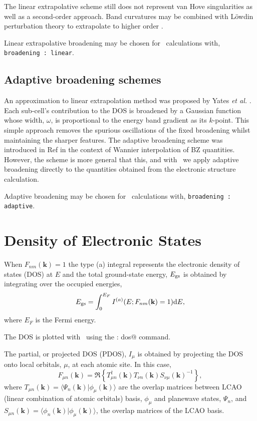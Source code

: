 \documentclass[a4paper,11pt,twoside]{book}
\newcommand{\kbf}{\mathbf{k}}
\renewcommand{\d}{\mathrm{d}}
\begin{document}
The linear extrapolative scheme still does not represent van Hove singularities as well as a second-order approach.  
%
Band curvatures may be combined with L\"owdin perturbation theory to extrapolate to higher order \cite{pickard:PRB:1999,pickard:PRB:2000}.

Linear extrapolative broadening may be chosen  for \optados\ calculations with, \texttt{broadening : linear}.


\subsection{Adaptive broadening schemes}
An approximation to linear extrapolation method was proposed by Yates \emph{et al.} \cite{yates:PRB:2007}.
%
Each sub-cell's contribution to the DOS is broadened by a Gaussian function whose width, $\omega$, is proportional to the energy band gradient as its $k$-point.
%
This simple approach removes the spurious oscillations of the fixed broadening whilst maintaining the sharper features.
%
The adaptive broadening scheme was introduced in Ref \cite{yates:PRB:2007} in the context of Wannier interpolation of BZ quantities. 
%
However, the scheme is more general that this, and with \optados\ we apply adaptive broadening directly to the quantities obtained from the electronic structure calculation.

Adaptive broadening may be chosen  for \optados\ calculations with, \texttt{broadening : adaptive}.



\section{Density of Electronic States} 

When $F_{nm}(\kbf)=1$ the type (a) integral represents the electronic density of states (DOS) at $E$ and the total ground-state energy, $E_{\rm gs}$ is obtained by integrating over the occupied energies,
\begin{equation}
E_{\rm gs} = \int^{E_{F}}_0 I^{(a)}( E; F_{nm}(\kbf)=1) \d E,
\end{equation}
where $E_F$ is the Fermi energy.

The DOS is plotted with \optados\ using the \verb@task : dos@ command.

The partial, or projected DOS (PDOS), $I_{\mu}$ is obtained by projecting the DOS onto local orbitals, $\mu$, at each atomic site\cite{segall:MP:1996}.
%
In this case,
\begin{equation}
F_{\mu n}(\kbf)=\Re \left \{  T_{\mu n}^{\dagger}(\kbf) T_{\nu n}(\kbf) S_{\nu \mu}(\kbf)^{-1} \right \},
\end{equation}
where $ T_{\mu n}(\kbf)= \langle \Psi_n(\kbf)|\phi_{\mu}(\kbf)
\rangle$ are the overlap matrices between LCAO (linear combination of
atomic orbitals) basis, $\phi_{\mu}$ and planewave states, $\Psi_n$, and  $ S_{\mu n}(\kbf)=\langle \phi_n(\kbf)|\phi_{\mu}(\kbf) \rangle$, the overlap matrices of the LCAO basis.
\end{document}

